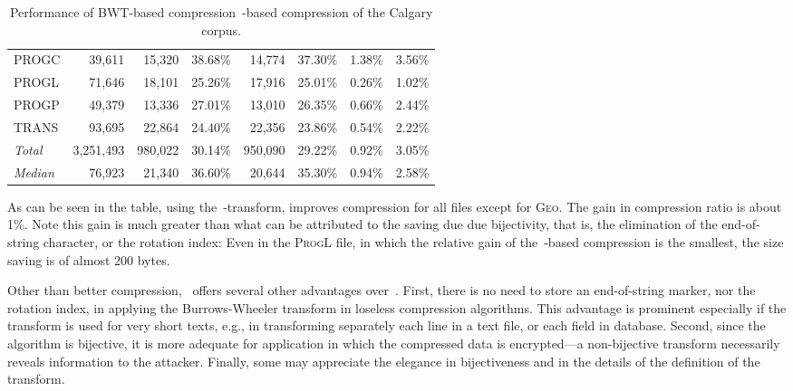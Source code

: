 \documentclass[a4paper,12pt]{article}
\numberwithin{algorithm}{section}
\begin{document}
\begin{table}[hbt]
\begin{center}
\begin{tabular}{| l | r | r r| r r| r r|}
\textsc{PROGC}   &   39,611  &   15,320  &   38.68\%  &   14,774  &   37.30\%  &   1.38\% &  3.56\%   \\
\textsc{PROGL}   &   71,646  &   18,101  &   25.26\%  &   17,916  &   25.01\%  &   0.26\%&   1.02\%   \\
\textsc{PROGP}   &   49,379  &   13,336  &   27.01\%  &   13,010  &   26.35\%  &   0.66\% &  2.44\%   \\
\textsc{TRANS}   &   93,695  &   22,864  &   24.40\%  &   22,356  &   23.86\%  &   0.54\%  & 2.22\%   \\  \hline
\emph{Total}   &   3,251,493   &   980,022 &   30.14\%  &   950,090 &   29.22\%  &   0.92\%  & 3.05\%   \\  \hline
\emph{Median}   &   76,923  &    21,340   &   36.60\%  &   20,644  &   35.30\%  &   0.94\% &  2.58\%   \\  \hline

\end{tabular}
\end{center}
\caption{Performance of BWT-based compression~-based compression of the Calgary corpus.}
\label{Table:comparison}
\end{table}


As can be seen in the table, using the~-transform, improves compression for all files except for \textsc{Geo}.
The gain in compression ratio is about 1\%.
Note this gain is much greater than what can be attributed to the saving due
  due bijectivity, that is, the elimination of the end-of-string character, or
  the rotation index: Even in the \textsc{ProgL} file, in which the relative gain
  of the~-based compression is the smallest, the size saving is
  of almost 200 bytes.

Other than better compression,~ offers several other
  advantages over~.
First, there is no need to store an end-of-string marker, nor the rotation index,
  in applying the Burrows-Wheeler transform in loseless compression algorithms.
This advantage is prominent especially if the transform is used for very
  short texts, e.g., in transforming
  separately each line in a text file, or each field in database.
Second, since the algorithm is bijective, it is more adequate for application in which the compressed data
  is encrypted---a non-bijective transform necessarily reveals information to the attacker.
Finally, some may appreciate the elegance in bijectiveness and in the details of the definition of the transform.
\end{document}
